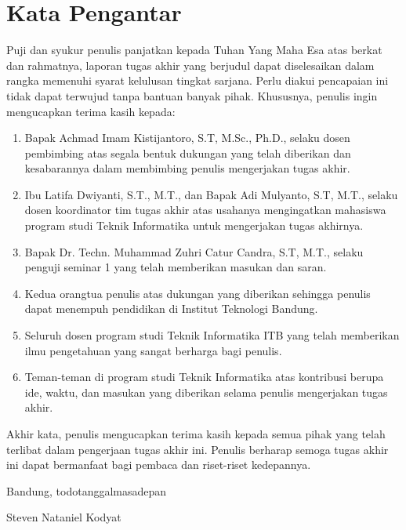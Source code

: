 \chapter*{Kata Pengantar}

Puji dan syukur penulis panjatkan kepada Tuhan Yang Maha Esa atas berkat dan rahmatnya, laporan tugas akhir yang berjudul \thetitle{} dapat diselesaikan dalam rangka memenuhi syarat kelulusan tingkat sarjana. Perlu diakui pencapaian ini tidak dapat terwujud tanpa bantuan banyak pihak. Khususnya, penulis ingin mengucapkan terima kasih kepada:

\begin{enumerate}
    \item Bapak Achmad Imam Kistijantoro, S.T, M.Sc., Ph.D., selaku dosen pembimbing atas segala bentuk dukungan yang telah diberikan dan kesabarannya dalam membimbing penulis mengerjakan tugas akhir.
    \item Ibu Latifa Dwiyanti, S.T., M.T., dan Bapak Adi Mulyanto, S.T, M.T., selaku dosen koordinator tim tugas akhir atas usahanya mengingatkan mahasiswa program studi Teknik Informatika untuk mengerjakan tugas akhirnya.
    \item Bapak Dr. Techn. Muhammad Zuhri Catur Candra, S.T, M.T., selaku penguji seminar 1 yang telah memberikan masukan dan saran.
    \item Kedua orangtua penulis atas dukungan yang diberikan sehingga penulis dapat menempuh pendidikan di Institut Teknologi Bandung.
    \item Seluruh dosen program studi Teknik Informatika ITB yang telah memberikan ilmu pengetahuan yang sangat berharga bagi penulis.
    \item Teman-teman di program studi Teknik Informatika atas kontribusi berupa ide, waktu, dan masukan yang diberikan selama penulis mengerjakan tugas akhir.
\end{enumerate}


Akhir kata, penulis mengucapkan terima kasih kepada semua pihak yang telah terlibat dalam pengerjaan tugas akhir ini. Penulis berharap semoga tugas akhir ini dapat bermanfaat bagi pembaca dan riset-riset kedepannya.

\begin{flushright}
    Bandung, todotanggalmasadepan

    \vspace{1.5cm}

    Steven Nataniel Kodyat
\end{flushright}